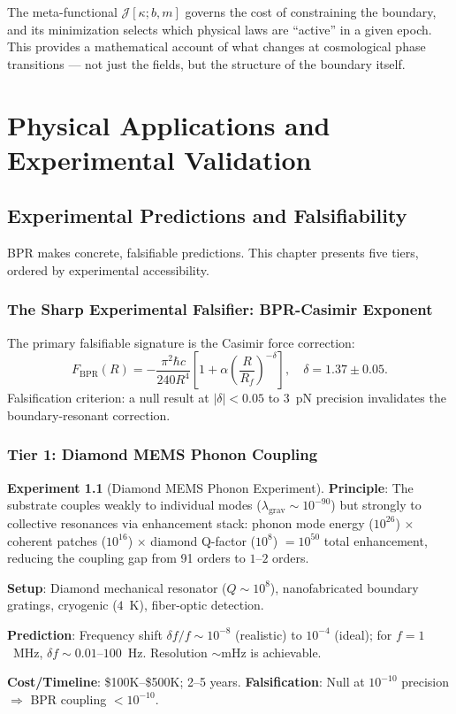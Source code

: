 \documentclass[12pt,oneside]{book}
\theoremstyle{definition}
\newtheorem{experiment}{Experiment}[chapter]
\begin{document}
The meta-functional $\mathcal{J}[\kappa; b, m]$ governs the cost of constraining
the boundary, and its minimization selects which physical laws are ``active'' in
a given epoch. This provides a mathematical account of what changes at cosmological
phase transitions --- not just the fields, but the structure of the boundary itself.

\part{Physical Applications and Experimental Validation}

\chapter{Experimental Predictions and Falsifiability}
\label{chap:experiments}

BPR makes concrete, falsifiable predictions. This chapter presents five tiers,
ordered by experimental accessibility.

\section{The Sharp Experimental Falsifier: BPR-Casimir Exponent}

The primary falsifiable signature is the Casimir force correction:
\begin{equation}
  \label{eq:casimir}
  F_{\mathrm{BPR}}(R) = -\frac{\pi^2\hbar c}{240 R^4}
  \left[1 + \alpha\!\left(\frac{R}{R_f}\right)^{-\delta}\right],
  \quad \delta = 1.37 \pm 0.05.
\end{equation}
Falsification criterion: a null result at $|\delta| < 0.05$ to $3$~pN precision
invalidates the boundary-resonant correction.

\section{Tier 1: Diamond MEMS Phonon Coupling}

\begin{experiment}[Diamond MEMS Phonon Experiment]
  \textbf{Principle}: The substrate couples weakly to individual modes
  ($\lambda_{\mathrm{grav}} \sim 10^{-90}$) but strongly to collective resonances
  via enhancement stack: phonon mode energy ($10^{26}$) $\times$ coherent patches
  ($10^{16}$) $\times$ diamond Q-factor ($10^8$) $= 10^{50}$ total enhancement,
  reducing the coupling gap from 91 orders to $1$--$2$ orders.

  \textbf{Setup}: Diamond mechanical resonator ($Q \sim 10^8$), nanofabricated
  boundary gratings, cryogenic ($4$~K), fiber-optic detection.

  \textbf{Prediction}: Frequency shift $\delta f/f \sim 10^{-8}$ (realistic)
  to $10^{-4}$ (ideal); for $f = 1$~MHz, $\delta f \sim 0.01$--$100$~Hz.
  Resolution $\sim$mHz is achievable.

  \textbf{Cost/Timeline}: \$100K--\$500K; 2--5 years.
  \textbf{Falsification}: Null at $10^{-10}$ precision $\Rightarrow$ BPR coupling
  $< 10^{-10}$.
\end{experiment}
\end{document}
